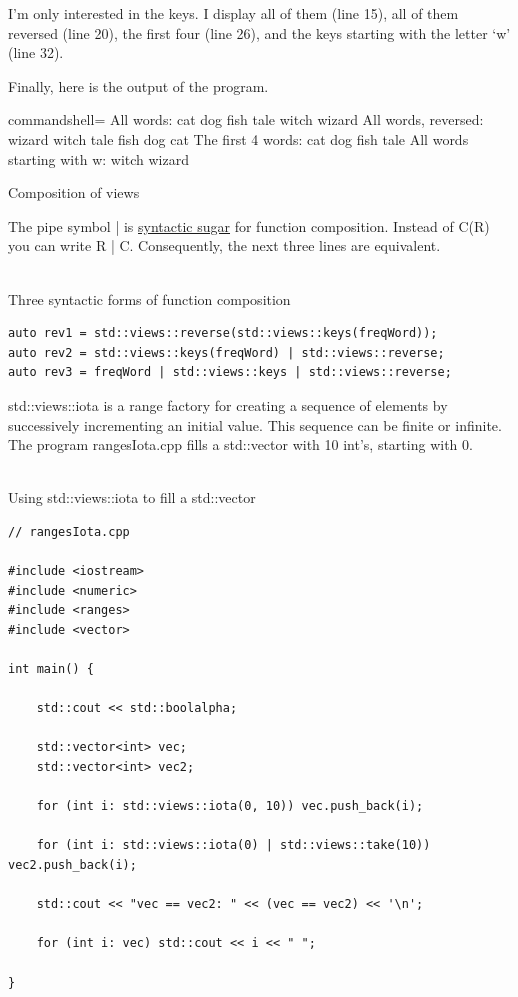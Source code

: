 I’m only interested in the keys. I display all of them (line 15), all of them reversed (line 20), the first four (line 26), and the keys starting with the letter ‘w’ (line 32).

Finally, here is the output of the program.

\begin{tcblisting}{commandshell={}}
All words: cat dog fish tale witch wizard
All words, reversed: wizard witch tale fish dog cat
The first 4 words: cat dog fish tale
All words starting with w: witch wizard
\end{tcblisting}

\begin{center}
Composition of views
\end{center}

The pipe symbol | is \href{https://en.wikipedia.org/wiki/Syntactic_sugar}{syntactic sugar} for function composition. Instead of C(R) you can write R | C. Consequently, the next three lines are equivalent.

\hspace*{\fill} \\ %
\noindent
Three syntactic forms of function composition
\begin{lstlisting}[style=styleCXX]
auto rev1 = std::views::reverse(std::views::keys(freqWord));
auto rev2 = std::views::keys(freqWord) | std::views::reverse;
auto rev3 = freqWord | std::views::keys | std::views::reverse;
\end{lstlisting}


std::views::iota is a range factory for creating a sequence of elements by successively incrementing an initial value. This sequence can be finite or infinite. The program rangesIota.cpp fills a std::vector with 10 int’s, starting with 0.

\hspace*{\fill} \\ %
\noindent
Using std::views::iota to fill a std::vector
\begin{lstlisting}[style=styleCXX]
// rangesIota.cpp

#include <iostream>
#include <numeric>
#include <ranges>
#include <vector>

int main() {
	
	std::cout << std::boolalpha;
	
	std::vector<int> vec;
	std::vector<int> vec2;
	
	for (int i: std::views::iota(0, 10)) vec.push_back(i);
	
	for (int i: std::views::iota(0) | std::views::take(10)) vec2.push_back(i);
	
	std::cout << "vec == vec2: " << (vec == vec2) << '\n';
	
	for (int i: vec) std::cout << i << " ";

}
\end{lstlisting}

